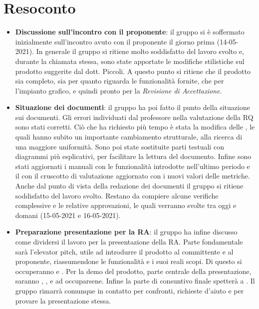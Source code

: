 \section{Resoconto}
\begin{itemize}
	\item  \textbf{Discussione sull'incontro con il proponente}: il gruppo si è soffermato inizialmente sull'incontro avuto con il proponente il giorno prima (14-05-2021). In generale il gruppo si ritiene molto soddisfatto del lavoro svolto e, durante la chiamata stessa, sono state apportate le modifiche stilistiche sul prodotto suggerite dal dott. Piccoli. 
	A questo punto si ritiene che il prodotto sia completo, sia per quanto riguarda le funzionalità fornite, che per l'impianto grafico, e quindi pronto per la \textit{Revisione di Accettazione}.
	\item \textbf{Situazione dei documenti}: il gruppo ha poi fatto il punto della situazione sui documenti. Gli errori individuati dal professore nella valutazione della RQ sono stati corretti. Ciò che ha richiesto più tempo è stata la modifica delle \NdP{}, le quali hanno subito un importante cambiamento strutturale, alla ricerca di una maggiore uniformità. Sono poi state sostituite parti testuali con diagrammi più esplicativi, per facilitare la lettura del documento.  
	Infine sono stati aggiornati i manuali con le funzionalità introdotte nell'ultimo periodo e il \PdQ{} con il cruscotto di valutazione aggiornato con i nuovi valori delle metriche.
	Anche dal punto di vista della redazione dei documenti il gruppo si ritiene soddisfatto del lavoro svolto. Restano da compiere alcune verifiche complessive e le relative approvazioni, le quali verranno svolte tra oggi e domani (15-05-2021 e 16-05-2021).
	\item \textbf{Preparazione presentazione per la RA}: il gruppo ha infine discusso come dividersi il lavoro per la presentazione della RA. 
	Parte fondamentale sarà l'elevator pitch, utile ad introdurre il prodotto al committente e al proponente, riassumendone le funzionalità e i suoi reali scopi. Di questo si occuperanno \ZM{} e \SP{}.
	Per la demo del prodotto, parte centrale della presentazione, saranno \SG{}, \BM{}, \RA{} e \SH{} ad occuparsene.
	Infine la parte di consuntivo finale spetterà a \PA{}.
	Il gruppo rimarrà comunque in contatto per confronti, richieste d'aiuto e per provare la presentazione stessa. 
\end{itemize}

\newpage